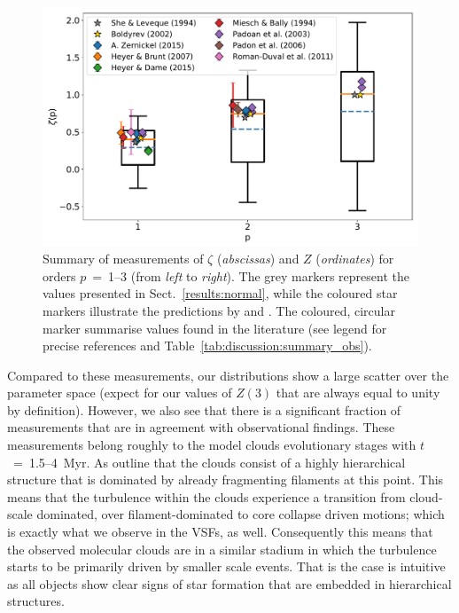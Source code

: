 \begin{figure}
	\includegraphics[width=\textwidth]{compare_observations.pdf}
	\caption{Summary of measurements of $\zeta$ (\textit{abscissas}) and $Z$ (\textit{ordinates}) for orders $p$~=~1--3 (from \textit{left} to \textit{right}). The grey markers represent the values presented in Sect.~\ref{results:normal}, while the coloured star markers illustrate the predictions by \citet{She1994} and \citet{Boldyrev2002}. The coloured, circular marker summarise values found in the literature (see legend for precise references and Table~\ref{tab:discussion:summary_obs}). 
	}
	\label{pic:discussion:comp_observation}
\end{figure}


Compared to these measurements, our distributions show a large scatter over the parameter space (expect for our values of $Z(3)$ that are always equal to unity by definition). 
However, we also see that there is a significant fraction of measurements that are in agreement with observational findings. 
These measurements belong roughly to the model clouds evolutionary stages with $t$~=~1.5--4~Myr.
As  outline that the clouds consist of a highly hierarchical structure that is dominated by already fragmenting filaments at this point.
This means that the turbulence within the clouds experience a transition from cloud-scale dominated, over filament-dominated to core collapse driven motions; which is exactly what we observe in the VSFs, as well.
Consequently this means that the observed molecular clouds are in a similar stadium in which the turbulence starts to be primarily driven by smaller scale events.
That is the case is intuitive as all objects show clear signs of star formation that are embedded in hierarchical structures.

